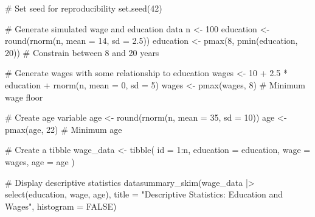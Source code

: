 \documentclass[
  letterpaper,
  DIV=11,
  numbers=noendperiod]{scrreprt}
\newenvironment{Shaded}{\begin{snugshade}}{\end{snugshade}}
\newcommand{\AttributeTok}[1]{\textcolor[rgb]{0.40,0.45,0.13}{#1}}
\newcommand{\CommentTok}[1]{\textcolor[rgb]{0.37,0.37,0.37}{#1}}
\newcommand{\ConstantTok}[1]{\textcolor[rgb]{0.56,0.35,0.01}{#1}}
\newcommand{\DecValTok}[1]{\textcolor[rgb]{0.68,0.00,0.00}{#1}}
\newcommand{\FloatTok}[1]{\textcolor[rgb]{0.68,0.00,0.00}{#1}}
\newcommand{\FunctionTok}[1]{\textcolor[rgb]{0.28,0.35,0.67}{#1}}
\newcommand{\NormalTok}[1]{\textcolor[rgb]{0.00,0.23,0.31}{#1}}
\newcommand{\OtherTok}[1]{\textcolor[rgb]{0.00,0.23,0.31}{#1}}
\newcommand{\SpecialCharTok}[1]{\textcolor[rgb]{0.37,0.37,0.37}{#1}}
\newcommand{\StringTok}[1]{\textcolor[rgb]{0.13,0.47,0.30}{#1}}
\begin{document}
\begin{Shaded}
\begin{Highlighting}[]
\CommentTok{\# Set seed for reproducibility}
\FunctionTok{set.seed}\NormalTok{(}\DecValTok{42}\NormalTok{)}

\CommentTok{\# Generate simulated wage and education data}
\NormalTok{n }\OtherTok{\textless{}{-}} \DecValTok{100}
\NormalTok{education }\OtherTok{\textless{}{-}} \FunctionTok{round}\NormalTok{(}\FunctionTok{rnorm}\NormalTok{(n, }\AttributeTok{mean =} \DecValTok{14}\NormalTok{, }\AttributeTok{sd =} \FloatTok{2.5}\NormalTok{))}
\NormalTok{education }\OtherTok{\textless{}{-}} \FunctionTok{pmax}\NormalTok{(}\DecValTok{8}\NormalTok{, }\FunctionTok{pmin}\NormalTok{(education, }\DecValTok{20}\NormalTok{))  }\CommentTok{\# Constrain between 8 and 20 years}

\CommentTok{\# Generate wages with some relationship to education}
\NormalTok{wages }\OtherTok{\textless{}{-}} \DecValTok{10} \SpecialCharTok{+} \FloatTok{2.5} \SpecialCharTok{*}\NormalTok{ education }\SpecialCharTok{+} \FunctionTok{rnorm}\NormalTok{(n, }\AttributeTok{mean =} \DecValTok{0}\NormalTok{, }\AttributeTok{sd =} \DecValTok{5}\NormalTok{)}
\NormalTok{wages }\OtherTok{\textless{}{-}} \FunctionTok{pmax}\NormalTok{(wages, }\DecValTok{8}\NormalTok{)  }\CommentTok{\# Minimum wage floor}

\CommentTok{\# Create age variable}
\NormalTok{age }\OtherTok{\textless{}{-}} \FunctionTok{round}\NormalTok{(}\FunctionTok{rnorm}\NormalTok{(n, }\AttributeTok{mean =} \DecValTok{35}\NormalTok{, }\AttributeTok{sd =} \DecValTok{10}\NormalTok{))}
\NormalTok{age }\OtherTok{\textless{}{-}} \FunctionTok{pmax}\NormalTok{(age, }\DecValTok{22}\NormalTok{)  }\CommentTok{\# Minimum age}

\CommentTok{\# Create a tibble}
\NormalTok{wage\_data }\OtherTok{\textless{}{-}} \FunctionTok{tibble}\NormalTok{(}
  \AttributeTok{id =} \DecValTok{1}\SpecialCharTok{:}\NormalTok{n,}
  \AttributeTok{education =}\NormalTok{ education,}
  \AttributeTok{wage =}\NormalTok{ wages,}
  \AttributeTok{age =}\NormalTok{ age}
\NormalTok{)}

\CommentTok{\# Display descriptive statistics}
\FunctionTok{datasummary\_skim}\NormalTok{(wage\_data }\SpecialCharTok{|\textgreater{}} \FunctionTok{select}\NormalTok{(education, wage, age),}
                 \AttributeTok{title =} \StringTok{"Descriptive Statistics: Education and Wages"}\NormalTok{,}
                 \AttributeTok{histogram =} \ConstantTok{FALSE}\NormalTok{)}
\end{Highlighting}
\end{Shaded}
\end{document}
